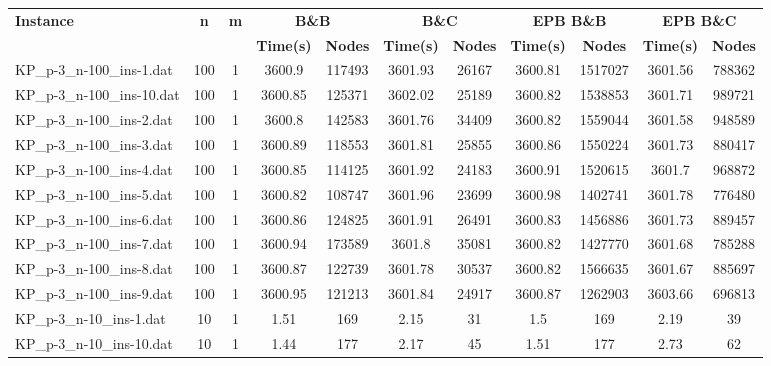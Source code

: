 \begin{table}[!ht]
\centering
\hspace*{-1cm}\begin{tabular}{lcccccccccc}
\toprule
\textbf{Instance} & \textbf{n} & \textbf{m} & \multicolumn{2}{c}{\textbf{B\&B}} & \multicolumn{2}{c}{\textbf{B\&C}}  & \multicolumn{2}{c}{\textbf{EPB B\&B}} & \multicolumn{2}{c}{\textbf{EPB B\&C}} \\

\cmidrule(r){4-5} \cmidrule(r){6-7} \cmidrule(r){8-9} \cmidrule(r){10-11} 
~ & ~ & ~ & \textbf{Time(s)} &\textbf{Nodes} & \textbf{Time(s)} &\textbf{Nodes} & \textbf{Time(s)} &\textbf{Nodes} & \textbf{Time(s)} &\textbf{Nodes}  \\
\midrule

KP\_p-3\_n-100\_ins-1.dat & 100 & 1 & 3600.9 & 117493 & 3601.93 & 26167 & 3600.81 & 1517027 & 3601.56 & 788362 \\
KP\_p-3\_n-100\_ins-10.dat & 100 & 1 & 3600.85 & 125371 & 3602.02 & 25189 & 3600.82 & 1538853 & 3601.71 & 989721 \\
KP\_p-3\_n-100\_ins-2.dat & 100 & 1 & 3600.8 & 142583 & 3601.76 & 34409 & 3600.82 & 1559044 & 3601.58 & 948589 \\
KP\_p-3\_n-100\_ins-3.dat & 100 & 1 & 3600.89 & 118553 & 3601.81 & 25855 & 3600.86 & 1550224 & 3601.73 & 880417 \\
KP\_p-3\_n-100\_ins-4.dat & 100 & 1 & 3600.85 & 114125 & 3601.92 & 24183 & 3600.91 & 1520615 & 3601.7 & 968872 \\
KP\_p-3\_n-100\_ins-5.dat & 100 & 1 & 3600.82 & 108747 & 3601.96 & 23699 & 3600.98 & 1402741 & 3601.78 & 776480 \\
KP\_p-3\_n-100\_ins-6.dat & 100 & 1 & 3600.86 & 124825 & 3601.91 & 26491 & 3600.83 & 1456886 & 3601.73 & 889457 \\
KP\_p-3\_n-100\_ins-7.dat & 100 & 1 & 3600.94 & 173589 & 3601.8 & 35081 & 3600.82 & 1427770 & 3601.68 & 785288 \\
KP\_p-3\_n-100\_ins-8.dat & 100 & 1 & 3600.87 & 122739 & 3601.78 & 30537 & 3600.82 & 1566635 & 3601.67 & 885697 \\
KP\_p-3\_n-100\_ins-9.dat & 100 & 1 & 3600.95 & 121213 & 3601.84 & 24917 & 3600.87 & 1262903 & 3603.66 & 696813 \\
KP\_p-3\_n-10\_ins-1.dat & 10 & 1 & 1.51 & 169 & 2.15 & 31 & 1.5 & 169 & 2.19 & 39 \\
KP\_p-3\_n-10\_ins-10.dat & 10 & 1 & 1.44 & 177 & 2.17 & 45 & 1.51 & 177 & 2.73 & 62 \\

\end{tabular}
\end{table}
